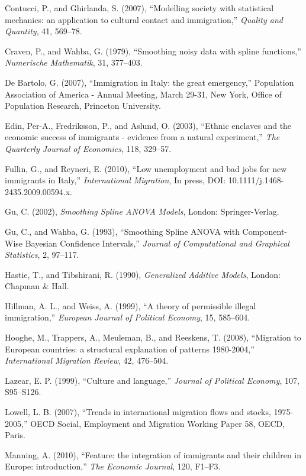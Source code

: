 \documentclass[10pt] {article}
\theoremstyle{definition}
\theoremstyle{plain}
\begin{document}
\begin{thebibliography}{99}
\bibitem{} Contucci, P., and Ghirlanda, S. (2007), ``Modelling society with statistical mechanics: an application to cultural contact and immigration,'' \textit{Quality and Quantity}, 41, 569--78.

\bibitem{} Craven, P., and Wahba, G. (1979), ``Smoothing noisy data with spline functions,'' \textit{Numerische Mathematik}, 31, 377--403.

\bibitem{} De Bartolo, G. (2007), ``Immigration in Italy: the great emergency,'' Population Association of America - Annual Meeting, March 29-31, New York, Office of Population Research, Princeton University.

\bibitem{} Edin, Per-A., Fredriksson, P., and Aslund, O. (2003), ``Ethnic enclaves and the economic success of immigrants - evidence from a natural experiment,'' \textit{The Quarterly Journal of Economics}, 118, 329--57.

\bibitem{} Fullin, G., and Reyneri, E. (2010), ``Low unemployment and bad jobs for new immigrants in Italy,'' \textit{International Migration}, In press, DOI: 10.1111/j.1468-2435.2009.00594.x.

\bibitem{} Gu, C. (2002), \textit{Smoothing Spline ANOVA Models}, London: Springer-Verlag.

\bibitem{} Gu, C., and Wahba, G. (1993), ``Smoothing Spline ANOVA with Component-Wise Bayesian Confidence Intervals,'' \textit{Journal of Computational and Graphical Statistics}, 2, 97--117.

\bibitem{} Hastie, T., and Tibshirani, R. (1990), \textit{Generalized Additive Models}, London: Chapman $\&$ Hall.

\bibitem{} Hillman, A. L., and Weiss, A. (1999), ``A theory of permissible illegal immigration,'' \textit{European Journal of Political Economy}, 15, 585--604.

\bibitem{} Hooghe, M., Trappers, A., Meuleman, B., and Reeskens, T. (2008), ``Migration to European countries: a structural explanation of patterns 1980-2004,'' \textit{International Migration Review}, 42, 476--504.

\bibitem{} Lazear, E. P. (1999), ``Culture and language,'' \textit{Journal of Political Economy}, 107, S95--S126.

\bibitem{} Lowell, L. B. (2007), ``Trends in international migration flows and stocks, 1975-2005,'' OECD Social, Employment and Migration Working Paper 58, OECD, Paris.

\bibitem{} Manning, A. (2010), ``Feature: the integration of immigrants and their children in Europe: introduction,'' \textit{The Economic Journal}, 120, F1--F3. 


\end{thebibliography}
\end{document}
